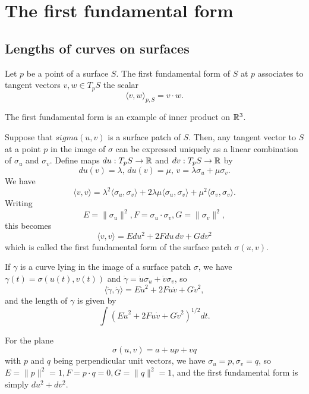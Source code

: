 \section{The first fundamental form}

\subsection{Lengths of curves on surfaces}

\begin{defn}
  Let $p$ be a point of a surface $S$.
  The first fundamental form of $S$ at $p$
  associates to tangent vectors $v, w \in T_p S$ the scalar
  \[
    \langle v, w \rangle_{p, S} = v \cdot w.
  \]
\end{defn}

\begin{remark}
  The first fundamental form is an example of inner product on $\mathbb{R}^3$.
\end{remark}

Suppose that $sigma(u, v)$ is a surface patch of $S$.
Then, any tangent vector to $S$ at a point $p$ in the image of $\sigma$
can be expressed uniquely as a linear combination of $\sigma_u$ and $\sigma_v$.
Define maps $du: T_p S \to \mathbb{R}$ and $dv: T_p S \to \mathbb{R}$ by
\[
  du(v) = \lambda, \, du(v) = \mu, \, v = \lambda \sigma_u + \mu \sigma_v.
\]
We have
\[
  \langle v, v \rangle = \lambda^2 \langle \sigma_u, \sigma_v \rangle +
  2 \lambda \mu \langle \sigma_u, \sigma_v \rangle +
  \mu^2 \langle \sigma_v, \sigma_v \rangle.  
\]
Writing
\[
  E = \|\sigma_u\|^2,
  F = \sigma_u \cdot \sigma_v,
  G = \|\sigma_v\|^2,
\]
this becomes
\[
  \langle v, v \rangle =
  E du^2 + 2 F du\, dv   + G dv^2
\]
which is called the first fundamental form of the surface patch $\sigma(u, v)$.

If $\gamma$ is a curve lying in the image of a surface patch $\sigma$, we have
$\gamma(t) = \sigma(u(t), v(t))$ and
$\dot{\gamma} = \dot{u} \sigma_u + \dot{v} \sigma_v$, so
\[
  \langle \dot{\gamma}, \dot{\gamma} \rangle =
  E \dot{u}^2 + 2 F \dot{u} \dot{v} + G \dot{v}^2,
\]
and the length of $\gamma$ is given by
\[
  \int (E \dot{u}^2 + 2 F \dot{u} \dot{v} + G \dot{v}^2)^{1/2}dt.
\]

\begin{example}
  For the plane
  \[
    \sigma(u, v) = a + up + vq  
  \]
  with $p$ and $q$ being perpendicular unit vectors, we have
  $\sigma_u = p, \sigma_v = q$, so
  $E = \|p\|^2 = 1,
  F = p \cdot q = 0,
  G = \|q\|^2 = 1$,
  and the first fundamental form is simply
  $du^2 + dv^2$.
\end{example}

